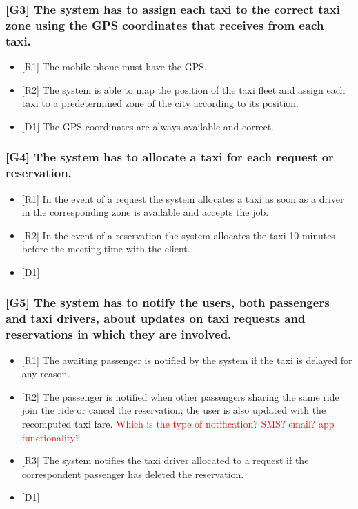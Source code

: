 \documentclass[a4paper,11pt]{report} %
\begin{document}
	\subsubsection{{[}G3{]} The system has to assign each taxi to the correct taxi zone using the GPS coordinates that receives from each taxi.}
	\begin{itemize}
		\item {[}R1{]} The mobile phone must have the GPS.
		\item {[}R2{]} The system is able to map the position of the taxi fleet and assign each taxi to a predetermined zone of the city according to its position.
		\item {[}D1{]} The GPS coordinates are always available and correct.
	\end{itemize}
	
	\subsubsection{{[}G4{]} The system has to allocate a taxi for each request or reservation.}
	\begin{itemize}
		\item {[}R1{]} In the event of a request the system allocates a taxi as soon as a driver in the corresponding zone is available and accepts the job.
		\item {[}R2{]} In the event of a reservation the system allocates the taxi 10 minutes before the meeting time with the client.
		\item {[}D1{]}
	\end{itemize}
		
	\subsubsection{{[}G5{]} The system has to notify the users, both passengers and taxi drivers, about updates on taxi requests and reservations in which they are involved.}
	\begin{itemize}
		\item {[}R1{]} The awaiting passenger is notified by the system if the taxi is delayed for any reason.
		\item {[}R2{]} The passenger is notified when other passengers sharing the same ride join the ride or cancel the reservation; the user is also updated with the recomputed taxi fare. \textcolor{red}{Which is the type of notification? SMS? email? app functionality?}
		\item {[}R3{]} The system notifies the taxi driver allocated to a request if the correspondent passenger has deleted the reservation.
		\item {[}D1{]}
	\end{itemize}
		
\end{document}
